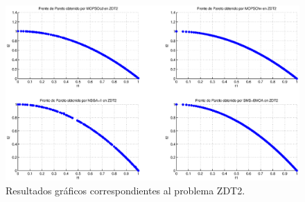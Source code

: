 \DIFaddend \clearpage
\newpage
\begin{figure}
      \begin{center}
	  \includegraphics[scale=0.45]{Cap4/rzdt2r.eps}
      \end{center}
	\caption{Resultados gr\'aficos correspondientes al problema ZDT2.}
      \label{fig:rZDT2}
      \end{figure}
\clearpage
\newpage
